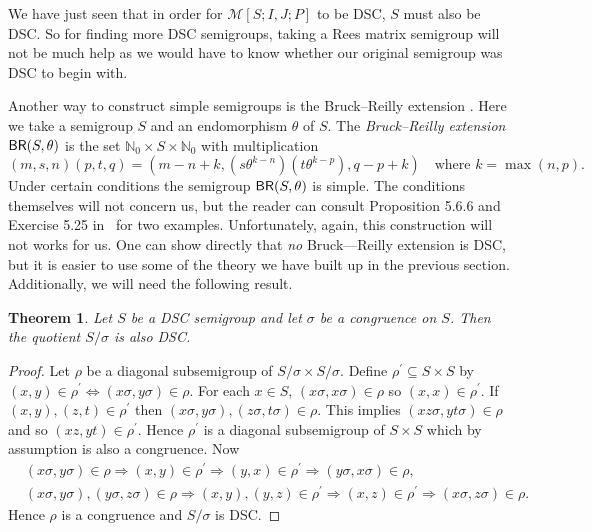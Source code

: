 \documentclass[a4paper, 12pt,reqno]{amsart}
\theoremstyle{plain}
\newtheorem{thm}{Theorem}[section]
\theoremstyle{definition}
\theoremstyle{remark}
\newcommand{\N}{\mathbb{N}}
\newcommand{\BR}{\textup{\textsf{BR}}}
\begin{document}
We have just seen that in order for $\mathcal{M}[S;I,J;P]$ to be DSC, $S$ must also be DSC. 
So for finding more DSC semigroups, taking a Rees matrix semigroup will not be much help as we would have to know whether our original semigroup was DSC to begin with. 

Another way to construct simple semigroups is the Bruck--Reilly extension \cite[Section~5.6]{Ho95}. Here we take a semigroup $S$ and an endomorphism $\theta$  of $S$. The \emph{Bruck--Reilly extension} $\BR(S,\theta)$ is the set $\N_0 \times S \times \N_0$ with multiplication
\begin{equation*}
    (m,s,n)(p,t,q) = (m - n + k , (s \theta^{k-n})(t \theta^{k - p}) , q - p + k)\quad
    \text{where }k = \max(n,p).
\end{equation*}
Under certain conditions the semigroup $\BR(S,\theta)$ is simple.
The conditions themselves will not concern us, but the reader can consult Proposition 5.6.6 and Exercise 5.25 in~\cite{Ho95} for two examples.
Unfortunately, again, this construction will not works for us.
One can show directly that \emph{no} Bruck---Reilly extension is DSC, but it is easier to use some of the theory we have built up in the previous section.
Additionally, we will need the following result.

\begin{thm}\label{quotient}
    Let $S$ be a DSC semigroup and let $\sigma$ be a congruence on $S$. Then the quotient $S/\sigma$ is also DSC.
\end{thm}

\begin{proof}
    Let $\rho$ be a diagonal subsemigroup of $S/\sigma \times S / \sigma$.
    Define $\rho^\prime \subseteq S \times S$ by $(x,y) \in \rho^\prime \iff (x\sigma , y\sigma) \in \rho$. 
    For each $x \in S$, $(x\sigma,x \sigma) \in \rho$ so $(x,x) \in \rho^\prime$. 
    If $(x,y),(z,t) \in \rho^\prime$ then $(x \sigma ,y \sigma), (z \sigma, t\sigma) \in \rho$. 
    This implies $(xz \sigma,yt \sigma) \in \rho$ and so $(xz,yt) \in \rho^\prime$. Hence $\rho^\prime$ is a diagonal subsemigroup of $S \times S$ which by assumption is also a congruence. 
    Now
    \begin{align*}
        &(x \sigma,y \sigma) \in \rho \Rightarrow (x,y) \in \rho^\prime \Rightarrow (y,x) \in \rho^\prime \Rightarrow (y \sigma , x \sigma ) \in \rho, \\
       & (x \sigma , y \sigma) , (y \sigma , z \sigma) \in \rho \Rightarrow (x,y),(y,z) \in \rho^\prime \Rightarrow (x,z)\in \rho^\prime \Rightarrow (x \sigma,z \sigma) \in \rho.
    \end{align*}
    Hence $\rho$ is a congruence and $S/\sigma$ is DSC.
\end{proof}
\end{document}
